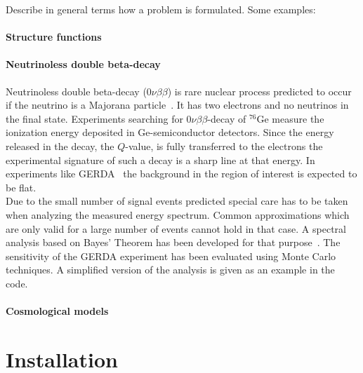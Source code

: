 \documentclass[11pt, a4paper]{article}
\begin{document}
Describe in general terms how a problem is formulated. Some examples:

\paragraph{Structure functions} 

\paragraph{Neutrinoless double beta-decay} 

Neutrinoless double beta-decay ($0\nu\beta\beta$) is rare nuclear
process predicted to occur if the neutrino is a Majorana
particle~\cite{Yao:2006px}. It has two electrons and no neutrinos in
the final state. Experiments searching for $0\nu\beta\beta$-decay of
$^{76}$Ge measure the ionization energy deposited in Ge-semiconductor
detectors. Since the energy released in the decay, the $Q$-value, is
fully transferred to the electrons the experimental signature of such
a decay is a sharp line at that energy. In experiments like
GERDA~\cite{Schonert:2005zn} the background in the region of interest
is expected to be flat. \\ 

\noindent 
Due to the small number of signal events predicted special care has to
be taken when analyzing the measured energy spectrum. Common
approximations which are only valid for a large number of events
cannot hold in that case. A spectral analysis based on Bayes' Theorem
has been developed for that purpose~\cite{Caldwell:2006yj}. The
sensitivity of the GERDA experiment has been evaluated using Monte
Carlo techniques. A simplified version of the analysis is given as an
example in the code. 

\paragraph{Cosmological models} 



\section{Installation}
\label{section:installation}
\end{document}
